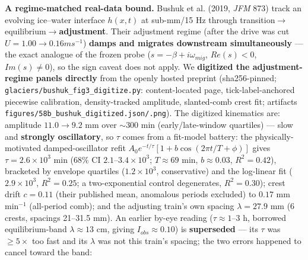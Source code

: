 \documentclass[tc, manuscript]{copernicus}
\begin{document}
\textbf{A regime-matched real-data bound.} Bushuk et al. (2019, \emph{JFM} 873) track an evolving ice–water interface $h(x,t)$ at sub-mm/15 Hz through transition\ensuremath{\to}equilibrium\ensuremath{\to}\textbf{adjustment}. Their adjustment regime (after the drive was cut $U=1.00\to 0.16 m s^{-1}$) \textbf{damps and migrates downstream simultaneously} — the exact analogue of the frozen probe ($s=-\beta +i\omega _{mig}$, $Re(s)<0$, $Im(s)\ne 0$), so the sign caveat does not apply. We \textbf{digitized the adjustment-regime panels directly} from the openly hosted preprint (sha256-pinned; \texttt{glaciers/\allowbreak{}bushuk\_\allowbreak{}fig3\_\allowbreak{}digitize.py}: content-located page, tick-label-anchored piecewise calibration, density-tracked amplitude, slanted-comb crest fit; artifacts \texttt{figures/\allowbreak{}58b\_\allowbreak{}bushuk\_\allowbreak{}digitized.\allowbreak{}json/.png}). The digitized kinematics are: amplitude $11.0\to 9.2$ mm over $\sim 300$ min (early/late-window quartiles) — slow and \textbf{strongly oscillatory}, so $\tau $ comes from a fit-model battery: the physically-motivated damped-oscillator refit $A_{0}e^{-t/\tau }[1+b\cos (2\pi t/T+\phi )]$ gives $\tau =2.6\times 10^{3}$ min (68\% CI $2.1$\mbox{--}$3.4\times 10^{3}$; $T\approx 69$ min, $b\approx 0.03$, $R^{2}=0.42$), bracketed by envelope quartiles ($1.2\times 10^{3}$, conservative) and the log-linear fit ($2.9\times 10^{3}$, $R^{2}=0.25$; a two-exponential control degenerates, $R^{2}=0.30$); crest drift $c=0.11$ (their published mean, anomalous periods excluded) to $0.17$ mm min$^{-1}$ (all-period comb); and the adjusting train's own spacing $\lambda =27.9$ mm (6 crests, spacings 21\mbox{--}31.5 mm). An earlier by-eye reading ($\tau \approx 1\mbox{--}3$ h, borrowed equilibrium-band $\lambda \approx 13$ cm, giving $I_{obs}\approx 0.10$) is \textbf{superseded} — its $\tau $ was $\ge 5\times $ too fast and its $\lambda $ was not this train's spacing; the two errors happened to cancel toward the band:
\end{document}
